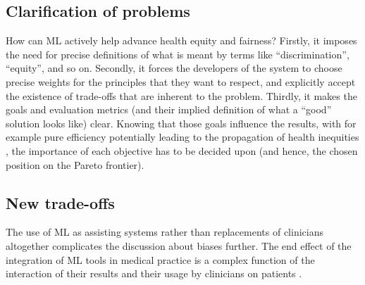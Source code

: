 \subsection{Clarification of problems}
How can ML actively help advance health equity and fairness?
Firstly, it imposes the need for precise definitions of what is meant by terms like ``discrimination'', ``equity'', and so on.
Secondly, it forces the developers of the system to choose precise weights for the principles that they want to respect, and explicitly accept the existence of trade-offs that are inherent to the problem.
Thirdly, it makes the goals and evaluation metrics (and their implied definition of what a ``good'' solution looks like) clear.
Knowing that those goals influence the results, with for example pure efficiency potentially leading to the propagation of health inequities \cite[p.~2]{Rajkomar2018}, the importance of each objective has to be decided upon (and hence, the chosen position on the Pareto frontier).

\subsection{New trade-offs}
The use of ML as assisting systems rather than replacements of clinicians altogether complicates the discussion about biases further.
The end effect of the integration of ML tools in medical practice is a complex function of the interaction of their results and their usage by clinicians on patients \cite[p.~4]{Rajkomar2018}.




